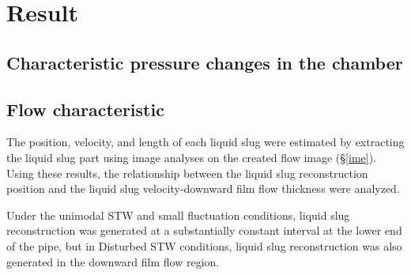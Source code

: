 \documentclass[aps,pre,preprint,groupedaddress,showkeys]{revtex4-2}
\begin{document}
\section{Result}\label{res}
\subsection{Characteristic pressure changes in the chamber}

\subsection{Flow characteristic}
The position, velocity, and length of each liquid slug were estimated by extracting the liquid slug part using image analyses on the created flow image (\S \ref{ime}).
Using these results, the relationship between the liquid slug reconstruction position and the liquid slug velocity-downward film flow thickness were analyzed.

Under the unimodal STW and small fluctuation conditions, liquid slug reconstruction was generated at a substantially constant interval at the lower end of the pipe, but in Disturbed STW conditions, liquid slug reconstruction was also generated in the downward film flow region.


\end{document}
